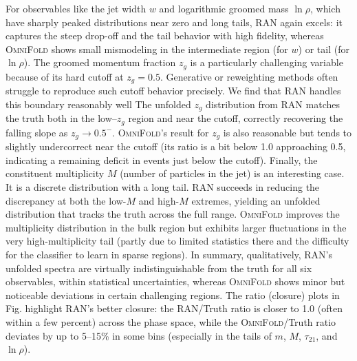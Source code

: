 {{            %
            For observables like the jet width $w$ and logarithmic groomed mass $\ln\rho$, which have sharply peaked distributions near zero and long tails, RAN again excels: it captures the steep drop-off and the tail behavior with high fidelity, whereas \textsc{OmniFold} shows small mismodeling in the intermediate region (for $w$) or tail (for $\ln\rho$).
            The groomed momentum fraction $z_g$ is a particularly challenging variable because of its hard cutoff at $z_g=0.5$.
            Generative or reweighting methods often struggle to reproduce such cutoff behavior precisely.
            We find that RAN handles this boundary reasonably well
            The unfolded $z_g$ distribution from RAN matches the truth both in the low--$z_g$ region and near the cutoff, correctly recovering the falling slope as $z_g \to 0.5^-$.
            \textsc{OmniFold}’s result for $z_g$ is also reasonable but tends to slightly undercorrect near the cutoff (its ratio is a bit below 1.0 approaching 0.5, indicating a remaining deficit in events just below the cutoff).
            Finally, the constituent multiplicity $M$ (number of particles in the jet) is an interesting case.
            It is a discrete distribution with a long tail.
            RAN succeeds in reducing the discrepancy at both the low-$M$ and high-$M$ extremes, yielding an unfolded distribution that tracks the truth across the full range.
            \textsc{OmniFold} improves the multiplicity distribution in the bulk region but exhibits larger fluctuations in the very high-multiplicity tail (partly due to limited statistics there and the difficulty for the classifier to learn in sparse regions).
            In summary, qualitatively, RAN’s unfolded spectra are virtually indistinguishable from the truth for all six observables, within statistical uncertainties, whereas \textsc{OmniFold} shows minor but noticeable deviations in certain challenging regions.
            The ratio (closure) plots in Fig. highlight RAN’s better closure: the RAN/Truth ratio is closer to 1.0 (often within a few percent) across the phase space, while the \textsc{OmniFold}/Truth ratio deviates by up to 5–15\% in some bins (especially in the tails of $m$, $M$, $\tau_{21}$, and $\ln\rho$).

}}
